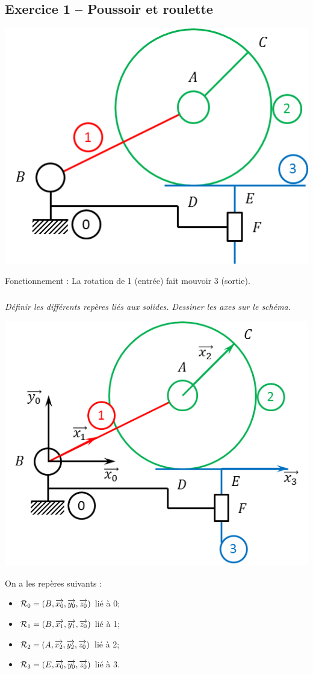\documentclass[10pt,fleqn]{article} %
\begin{document}

\vspace{7.5cm}
\pagestyle{fancy}
\thispagestyle{plain}


\def\columnseprulecolor{\color{ocre}}
\setlength{\columnseprule}{0.4pt} 
\begin{multicols}{2}
\subsection*{Exercice 1 -- Poussoir et roulette}
 
\begin{center}
\includegraphics[width=.8\linewidth]{images/fig1_1b} 
\end{center}
Fonctionnement : La rotation de 1 (entrée) fait mouvoir 3 (sortie).

\subparagraph{}
\textit{Définir les différents repères liés aux solides. Dessiner les axes sur le schéma.}

\ifprof
\begin{corrige}
\begin{center}
\includegraphics[width=.6\textwidth]{images/fig1_1c} 
\end{center}
On a les repères suivants :
\begin{itemize}
\item $\mathcal{R}_0=\left(B,\overrightarrow{x_0},\overrightarrow{y_0},\overrightarrow{z_0} \right)$ lié à 0;
\item $\mathcal{R}_1=\left(B,\overrightarrow{x_1},\overrightarrow{y_1},\overrightarrow{z_0} \right)$ lié à 1;
\item $\mathcal{R}_2=\left(A,\overrightarrow{x_2},\overrightarrow{y_2},\overrightarrow{z_0}\right)$ lié à 2;
\item $\mathcal{R}_3=\left(E,\overrightarrow{x_0},\overrightarrow{y_0},\overrightarrow{z_0} \right)$ lié à 3.
\end{itemize}
\end{corrige}
\else
\fi


\end{multicols}
\end{document}
